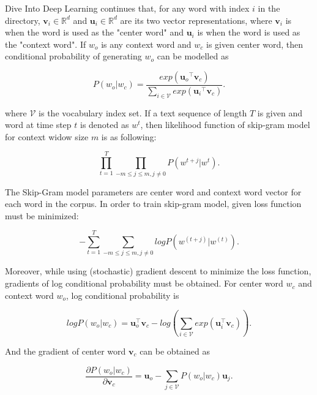 \documentclass[man]{apa7}
\begin{document}
Dive Into Deep Learning continues that, for any word with index $\mathit{i}$ in the directory, $\mathbf{v_\mathit{i}} \in \mathbb{R}^d$ and $\mathbf{u_\mathit{i}} \in \mathbb{R}^d$ are its two vector representations, where $\mathbf{v_\mathit{i}}$ is when the word is used as the "center word" and $\mathbf{u_\mathit{i}}$ is when the word is used as the "context word". If $\mathit{w_o}$ is any context word and $\mathit{w_c}$ is given center word, then conditional probability of generating $\mathit{w_o}$ can be modelled as

\begin{equation}
P(w_o | w_c) = \frac{exp(\mathbf{u_\mathit{o}}^\top \mathbf{v_\mathit{c}})}{\sum_{i \in \mathcal{V}} exp(\mathbf{u_\mathit{i}}^\top \mathbf{v_\mathit{c}})}.
\end{equation}

where $ \mathcal{V}$ is the vocabulary index set. If a text sequence of length $T$ is given and word at time step $t$ is denoted as $\mathit{w}^t$, then likelihood function of skip-gram model for context widow size $m$ is as following:

\begin{equation}
\prod_{t=1}^T \prod_{-m \le j \le m , j \neq 0} P(w^{t+j} | w^t).
\end{equation}

The Skip-Gram model parameters are center word and context word vector for each word in the corpus. In order to train skip-gram model, given loss function must be minimized:

$$ -\sum_{t=1}^T \sum_{-m \le j \le m, j \neq 0} logP(w^{(t+j)} | w^{(t)}).$$

Moreover, while using (stochastic) gradient descent to minimize the loss function, gradients of log conditional probability must be obtained. For center word $w_c$ and context word $w_o$, log conditional probability is

\begin{equation}
logP(w_o|w_c) = \mathbf{u}_o^\top \mathbf{v}_c - log(\sum_{i \in \mathcal{V}} exp(\mathbf{u}_i^\top \mathbf{v}_c)).
\end{equation}

And the gradient of center word $\mathbf{v}_c$ can be obtained as

\begin{equation}
\frac{\partial P(w_o | w_c)}{\partial \mathbf{v}_c} = \mathbf{u}_o - \sum_{j \in \mathcal{V}} P(w_o|w_c)\mathbf{u}_j.
\end{equation}
\end{document}
